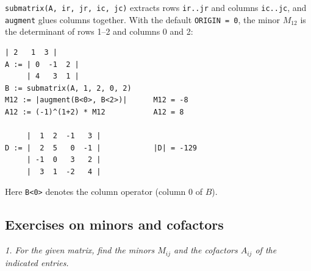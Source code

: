 \texttt{submatrix(A, ir, jr, ic, jc)} extracts rows \texttt{ir..jr} and columns
\texttt{ic..jc}, and \texttt{augment} glues columns together. With the default
\texttt{ORIGIN = 0}, the minor $M_{12}$ is the determinant of rows 1–2 and
columns 0 and 2:
\begin{Verbatim}[fontsize=\footnotesize,frame=single,label={\small Mathcad}]
     | 2   1  3 |
A := | 0  -1  2 |
     | 4   3  1 |
B := submatrix(A, 1, 2, 0, 2)
M12 := |augment(B<0>, B<2>)|      M12 = -8
A12 := (-1)^(1+2) * M12           A12 = 8

     |  1  2  -1   3 |
D := |  2  5   0  -1 |            |D| = -129
     | -1  0   3   2 |
     |  3  1  -2   4 |
\end{Verbatim}
Here \texttt{B<0>} denotes the column operator (column 0 of $B$).

\subsection{Exercises on minors and cofactors}
\bigskip
\emph{1. For the given matrix, find the minors $M_{ij}$ and the cofactors $A_{ij}$ of the indicated entries.}
\bigskip
